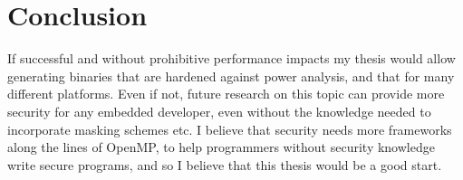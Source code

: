 \documentclass{article}
\begin{document}
\section{Conclusion}
\label{sec:conclusion-schedule}
If successful and without prohibitive performance impacts my thesis would allow generating binaries that are hardened against power analysis, and that for many different platforms.
Even if not, future research on this topic can provide more security for any embedded developer, even without the knowledge needed to incorporate masking schemes etc.
I believe that security needs more frameworks along the lines of OpenMP\cite{dagum1998openmp}, to help programmers without security knowledge write secure programs, and so I believe that this thesis would be a good start.



\end{document}
